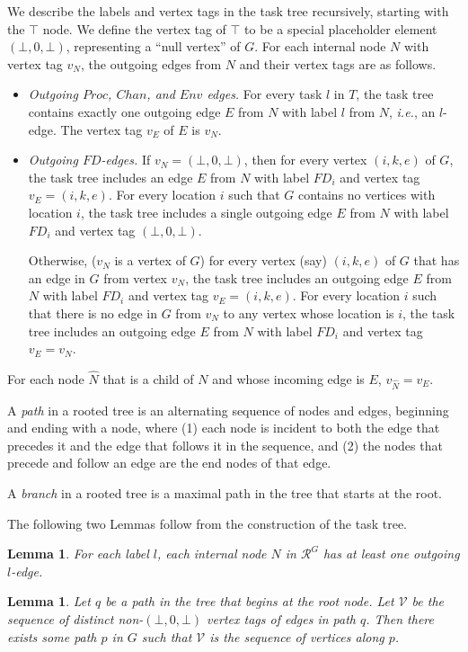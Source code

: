 \documentclass[11pt]{article}
\numberwithin{theorem}{section}
\newtheorem{lemma}[theorem]{Lemma}
\begin{document}
We describe the labels and vertex tags in the task tree recursively,
starting with the $\top$ node. 
We define the vertex tag of $\top$ to be a special placeholder element
$(\bot,0,\bot)$, representing a ``null vertex'' of $G$.
For each internal node $N$ with vertex tag $v_N$, the outgoing edges
from $N$ and their vertex tags are as follows.
\begin{itemize}
\item
\emph{Outgoing $Proc$, $Chan$, and $Env$ edges.}
For every task $l$ in $T$, the task tree contains exactly one outgoing
edge $E$ from $N$ with label $l$ from $N$, \textit{i.e.}, an $l$-edge. 
The vertex tag $v_E$ of $E$ is $v_N$. 
\item
\emph{Outgoing $FD$-edges.} 
If $v_N = (\bot,0,\bot)$, then for every vertex $(i,k,e)$ of $G$, the task tree includes an edge $E$ from $N$ with label $FD_i$ and vertex tag $v_E = (i,k,e)$. 
For every location $i$ such that $G$ contains no vertices with location $i$, the task tree includes a single outgoing edge $E$ from $N$ with label $FD_i$ and vertex tag $(\bot,0,\bot)$.

Otherwise, ($v_N$ is a vertex of $G$) for every vertex (say) $(i,k,e)$ of $G$ that has an edge in $G$ from
vertex $v_N$, the task tree includes an outgoing edge $E$ from $N$ with
label $FD_i$ and vertex tag $v_E = (i,k,e)$. 
For every location $i$ such that there is no edge in $G$ from $v_N$ to
any vertex whose location is $i$, the task tree includes an outgoing edge
$E$ from $N$ with label $FD_i$ and vertex tag $v_E = v_N$.
\end{itemize}
For each node $\hat{N}$ that is a child of $N$ and whose incoming edge is
$E$, $v_{\hat{N}} = v_E$.

A \emph{path} in a rooted tree is an alternating sequence of nodes and edges,
  beginning and ending with a node, where (1) each node is incident to
  both the edge that precedes it and the edge that follows it in the
  sequence, and (2) the nodes that precede and follow an edge are the
  end nodes of that edge.
  
A \emph{branch} in a rooted tree is a maximal path in the tree that starts at the root. 


The following two Lemmas follow from the construction of the task tree.
\begin{lemma}\label{prop:allLabelsExist}
For each label $l$, each internal node $N$ in $\mathcal{R}^{G}$ has at
least one outgoing $l$-edge.
\end{lemma}


\begin{lemma}
Let $q$ be a path in the tree that begins at the root node.
Let $\mathcal{V}$ be the sequence of distinct non-$(\bot,0,\bot)$ vertex tags of edges in path $q$.
Then there exists some path $p$ in $G$ such that $\mathcal{V}$ is the sequence of vertices along $p$.
\end{lemma}
\end{document}
